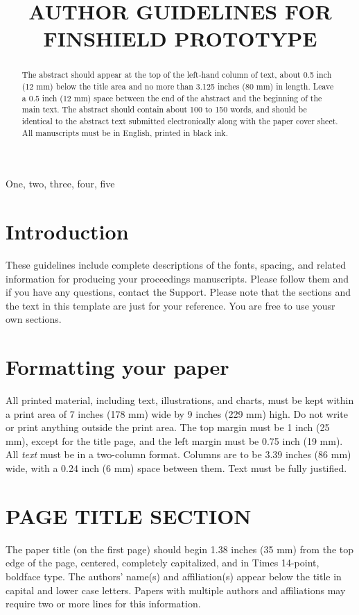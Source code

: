 \documentclass{article}
\title{AUTHOR GUIDELINES FOR FINSHIELD PROTOTYPE}
\begin{document}
%
\maketitle
%
\begin{abstract}
The abstract should appear at the top of the left-hand column of text, about
0.5 inch (12 mm) below the title area and no more than 3.125 inches (80 mm) in
length.  Leave a 0.5 inch (12 mm) space between the end of the abstract and the
beginning of the main text.  The abstract should contain about 100 to 150
words, and should be identical to the abstract text submitted electronically
along with the paper cover sheet.  All manuscripts must be in English, printed
in black ink.
\end{abstract}
%
\begin{keywords}
One, two, three, four, five
\end{keywords}
%
\section{Introduction}
\label{sec:intro}

These guidelines include complete descriptions of the fonts, spacing, and
related information for producing your proceedings manuscripts. Please follow
them and if you have any questions, contact the Support.
Please note that the sections and the text in this template are just for your reference. You are free to use yousr own sections.


\section{Formatting your paper}
\label{sec:format}

All printed material, including text, illustrations, and charts, must be kept
within a print area of 7 inches (178 mm) wide by 9 inches (229 mm) high. Do
not write or print anything outside the print area. The top margin must be 1
inch (25 mm), except for the title page, and the left margin must be 0.75 inch
(19 mm).  All {\it text} must be in a two-column format. Columns are to be 3.39
inches (86 mm) wide, with a 0.24 inch (6 mm) space between them. Text must be
fully justified.

\section{PAGE TITLE SECTION}
\label{sec:pagestyle}

The paper title (on the first page) should begin 1.38 inches (35 mm) from the
top edge of the page, centered, completely capitalized, and in Times 14-point,
boldface type.  The authors' name(s) and affiliation(s) appear below the title
in capital and lower case letters.  Papers with multiple authors and
affiliations may require two or more lines for this information.
\end{document}
